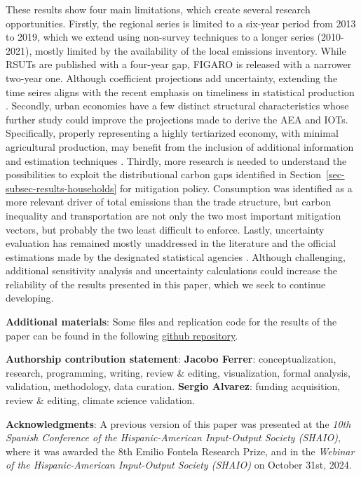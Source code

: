 \documentclass[
  10pt,
  twocolumn]{aft}
\begin{document}
These results show four main limitations, which create several research
opportunities. Firstly, the regional series is limited to a six-year
period from 2013 to 2019, which we extend using non-survey techniques to
a longer series (2010-2021), mostly limited by the availability of the
local emissions inventory. While RSUTs are published with a four-year
gap, FIGARO is released with a narrower two-year one. Although
coefficient projections add uncertainty, extending the time seires
aligns with the recent emphasis on timeliness in statistical production
\citep[p.~190]{oecdOECDHandbookCompilation2024}. Secondly, urban
economies have a few distinct structural characteristics whose further
study could improve the projections made to derive the AEA and IOTs.
Specifically, properly representing a highly tertiarized economy, with
minimal agricultural production, may benefit from the inclusion of
additional information and estimation techniques
\citep{zheng_entropy-based_2022}. Thirdly, more research is needed to
understand the possibilities to exploit the distributional carbon gaps
identified in Section~\ref{sec-subsec-results-households} for mitigation
policy. Consumption was identified as a more relevant driver of total
emissions than the trade structure, but carbon inequality and
transportation are not only the two most important mitigation vectors,
but probably the two least difficult to enforce. Lastly, uncertainty
evaluation has remained mostly unaddressed in the literature and the
official estimations made by the designated statistical agencies
\citep{eea_environmental_2013}. Although challenging, additional
sensitivity analysis and uncertainty calculations could increase the
reliability of the results presented in this paper, which we seek to
continue developing.

\vspace{1cm}

\textbf{Additional materials}: Some files and replication code for the
results of the paper can be found in the following
\href{https://github.com/jferrherz/carbon_footprint_madrid_city}{github
repository}.

\textbf{Authorship contribution statement}: \textbf{Jacobo Ferrer}:
conceptualization, research, programming, writing, review \& editing,
visualization, formal analysis, validation, methodology, data curation.
\textbf{Sergio Alvarez}: funding acquisition, review \& editing, climate
science validation.

\textbf{Acknowledgments}: A previous version of this paper was presented
at the \emph{10th Spanish Conference of the Hispanic-American
Input-Output Society (SHAIO)}, where it was awarded the 8th Emilio
Fontela Research Prize, and in the \emph{Webinar of the
Hispanic-American Input-Output Society (SHAIO)} on October 31st, 2024.
\end{document}
